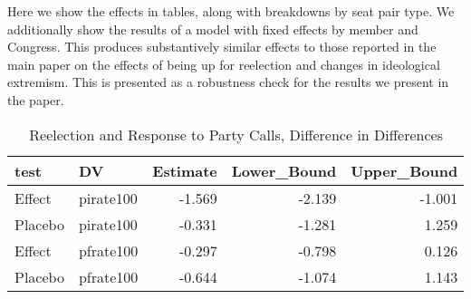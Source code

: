 \documentclass[12pt]{article}
\begin{document}
Here we show the effects in tables, along with breakdowns by seat pair type. We additionally show the results of a model with fixed effects by member and Congress. This produces substantively similar effects to those reported in the main paper on the effects of being up for reelection and changes in ideological extremism. This is presented as a robustness check for the results we present in the paper.

\begin{table}[H]
	\centering
	\caption{Reelection and Response to Party Calls, Difference in Differences} 
	\begin{tabular}{llrrr}
		\hline
		test & DV & Estimate & Lower\_Bound & Upper\_Bound \\ 
		\hline
		Effect & pirate100 & -1.569 & -2.139 & -1.001 \\ 
		Placebo & pirate100 & -0.331 & -1.281 & 1.259 \\ 
		Effect & pfrate100 & -0.297 & -0.798 & 0.126 \\ 
		Placebo & pfrate100 & -0.644 & -1.074 & 1.143 \\ 
		\hline
	\end{tabular}
\end{table}
\end{document}
